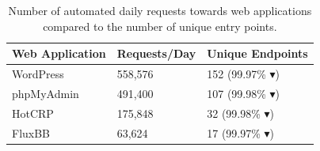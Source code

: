 \begin{table}[]
    \caption{Number of automated daily requests towards web applications compared to the number of unique entry points.}
    \centering
    \begin{tabular}{|l|l|l|}
    \hline
    \textbf{Web Application} & \textbf{Requests/Day} & \textbf{Unique Endpoints} \\ \hline
    WordPress                & 558,576               & 152 (99.97\% $\blacktriangledown$)             \\ \hline
    phpMyAdmin               & 491,400               & 107 (99.98\% $\blacktriangledown$)             \\ \hline
    HotCRP                   & 175,848                 & 32 (99.98\% $\blacktriangledown$)              \\ \hline
    FluxBB                   & 63,624                & 17 (99.97\% $\blacktriangledown$)              \\ \hline
    \end{tabular}
    \label{tab:logreduction}
\end{table}

